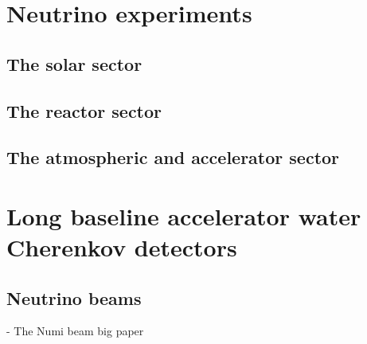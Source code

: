 \section{Neutrino experiments} %
\label{sec:exp_exp} %

\subsection{The solar sector} %
\label{sec:exp_exp_solar} %

\subsection{The reactor sector} %
\label{sec:exp_exp_reactor} %

\subsection{The atmospheric and accelerator sector} %
\label{sec:exp_exp_atmospheric} %

\section{Long baseline accelerator water Cherenkov detectors} %
\label{sec:exp_long} %

\subsection{Neutrino beams} %
\label{sec:exp_long_beams} %

- The Numi beam big paper~\cite{adamson2016}

